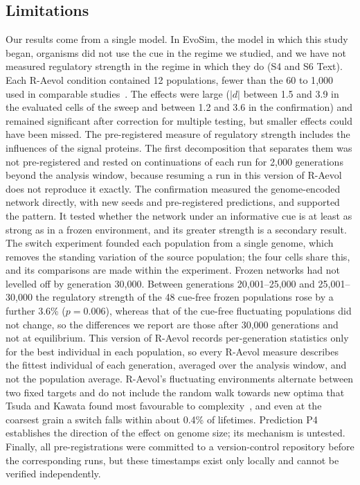 \documentclass[10pt,letterpaper]{article}
\begin{document}
\subsection*{Limitations}

Our results come from a single model. In EvoSim, the model in which this study
began, organisms did not use the cue in the regime we studied, and we have not
measured regulatory strength in the regime in which they do (S4 and S6 Text).
Each R-Aevol condition contained 12 populations, fewer than the 60 to 1{,}000 used in
comparable studies~\cite{tsuda2010,lalejini2021,jorritsma2026}. The effects were large ($|d|$
between 1.5 and 3.9 in the evaluated cells of the sweep and between 1.2 and 3.6
in the confirmation) and remained significant after
correction for multiple testing, but smaller effects could have been missed. The
pre-registered measure of regulatory strength includes the influences of the
signal proteins. The first decomposition that separates them was not
pre-registered and rested on continuations of each run for 2{,}000 generations
beyond the analysis window, because resuming a run in this version of R-Aevol
does not reproduce it exactly. The confirmation measured the genome-encoded
network directly, with new seeds and pre-registered predictions, and supported
the pattern. It tested whether the network under an informative cue is at least
as strong as in a frozen environment, and its greater strength is a secondary
result.
The switch experiment founded each population from a single genome, which
removes the standing variation of the source population; the four cells share
this, and its comparisons are made within the experiment. Frozen networks had
not levelled off by generation 30{,}000. Between
generations 20{,}001--25{,}000 and 25{,}001--30{,}000 the regulatory strength of
the 48 cue-free frozen populations rose by a further 3.6\% ($p=0.006$), whereas
that of the cue-free fluctuating populations did not change, so the differences
we report are those after 30{,}000 generations and not at equilibrium.
This version of R-Aevol records per-generation statistics only for the best
individual in each population, so every R-Aevol measure describes the fittest
individual of each generation, averaged over the analysis window, and not the
population average. R-Aevol's fluctuating environments alternate between two
fixed targets and do not include the random walk towards new optima that Tsuda
and Kawata found most favourable to complexity~\cite{tsuda2010}, and even at the
coarsest grain a switch falls within about 0.4\% of lifetimes. Prediction P4
establishes the direction of the effect on genome size; its mechanism is
untested. Finally, all pre-registrations were committed to a version-control
repository before the corresponding runs, but these timestamps exist only
locally and cannot be verified independently.
\end{document}
